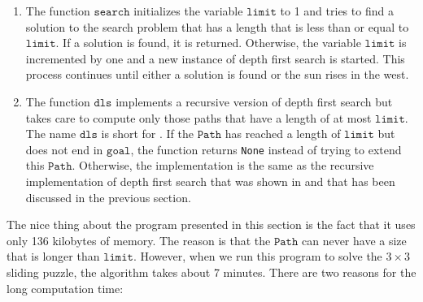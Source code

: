 \begin{enumerate}
\item The function $\texttt{search}$ initializes the variable $\texttt{limit}$ to 1 and tries to find a solution
      to the search problem that has a length that is less than or equal to $\texttt{limit}$.  If a solution is
      found, it is returned.  Otherwise, the variable $\texttt{limit}$ is incremented by one and a
      new instance of depth first search is started.  This process continues until either 
      a solution is found or the sun rises in the west.
\item The function $\texttt{dls}$ implements a recursive version of depth first search but takes care to compute only
      those paths that have a length of at most $\texttt{limit}$.  The name $\texttt{dls}$ is short for 
      .  If the $\texttt{Path}$ has reached a length
      of $\texttt{limit}$ but does not end in $\texttt{goal}$, the function returns \texttt{None} instead of
      trying to extend this $\texttt{Path}$.  Otherwise, the implementation is the same as the recursive
      implementation of depth first search that was shown in 
      and that has been discussed in the previous section.

\end{enumerate}
The nice thing about the program presented in this section is the fact that it uses only 136 kilobytes of
memory.  The reason is that the $\texttt{Path}$ can never have a size that is longer than $\texttt{limit}$.
However, when we run this program to solve the $3 \times 3$ sliding puzzle, the algorithm takes
about 7 minutes.  There are two reasons for the long computation time:
